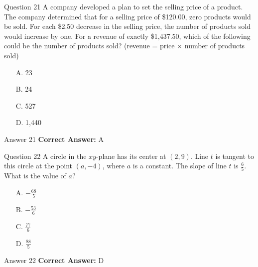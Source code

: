 \documentclass{beamer}
\begin{document}
\begin{frame}{Question 21}
\small
A company developed a plan to set the selling price of a product.  
The company determined that for a selling price of \$120.00, zero products would be sold.  
For each \$2.50 decrease in the selling price, the number of products sold would increase by one.  
For a revenue of exactly \$1,437.50, which of the following could be the number of products sold?  
(revenue = price $\times$ number of products sold)
\vspace{0.35cm}
\begin{enumerate}
    \item[A.] 23
    \item[B.] 24
    \item[C.] 527
    \item[D.] 1,440
\end{enumerate}
\end{frame}
\begin{frame}{Answer 21}
\small
\textbf{Correct Answer:} A
\end{frame}

\begin{frame}{Question 22}
\small
A circle in the $xy$-plane has its center at $(2, 9)$.  
Line $t$ is tangent to this circle at the point $(a, -4)$, where $a$ is a constant.  
The slope of line $t$ is $\frac{6}{5}$.  
What is the value of $a$?
\vspace{0.35cm}
\begin{enumerate}
    \item[A.] $-\frac{68}{5}$
    \item[B.] $-\frac{53}{6}$
    \item[C.] $\frac{77}{6}$
    \item[D.] $\frac{88}{5}$
\end{enumerate}
\end{frame}
\begin{frame}{Answer 22}
\small
\textbf{Correct Answer:} D
\end{frame}
\end{document}

